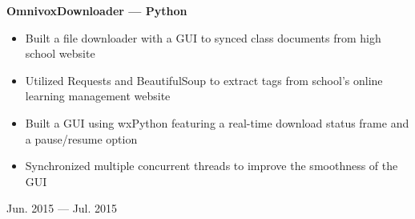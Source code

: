 \documentclass[9pt]{extarticle}
\begin{document}
\begin{minipage}[t]{.80\linewidth}
\begin{flushleft}
\textbf{OmnivoxDownloader --- Python}
\begin{itemize}
	\item Built a file downloader with a GUI to synced class documents
		from high school website
	\item Utilized Requests and BeautifulSoup to
		extract tags from school's online learning management website
	\item Built a GUI using wxPython featuring
		a real-time download status frame and a pause/resume option
	\item Synchronized multiple concurrent threads to improve the smoothness
		of the GUI
\end{itemize}
\end{flushleft}
\end{minipage}
\hfill
\begin{minipage}[t]{.19\linewidth}
\begin{flushright}
Jun. 2015 --- Jul. 2015
\end{flushright}
\end{minipage}
\end{document}
